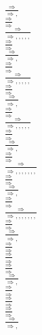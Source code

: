 \documentclass[11pt]{article}
\begin{document}
\begin{center}
\bigskip
\\$\frac{\Rightarrow }{\Rightarrow , }$
\bigskip
\\$\frac{\Rightarrow }{\Rightarrow }$
\bigskip
\\$\frac{\Rightarrow }{\Rightarrow , , , , , }$
\bigskip
\\$\frac{\Rightarrow }{\Rightarrow }$
\bigskip
\\$\frac{\Rightarrow }{\Rightarrow , }$
\bigskip
\\$\frac{\Rightarrow }{\Rightarrow }$
\bigskip
\\$\frac{\Rightarrow }{\Rightarrow , , , , , }$
\bigskip
\\$\frac{\Rightarrow }{\Rightarrow }$
\bigskip
\\$\frac{\Rightarrow }{\Rightarrow , }$
\bigskip
\\$\frac{\Rightarrow }{\Rightarrow }$
\bigskip
\\$\frac{\Rightarrow }{\Rightarrow , , , , , }$
\bigskip
\\$\frac{\Rightarrow }{\Rightarrow }$
\bigskip
\\$\frac{\Rightarrow }{\Rightarrow , }$
\bigskip
\\$\frac{\Rightarrow }{\Rightarrow }$
\bigskip
\\$\frac{\Rightarrow }{\Rightarrow , , , , , , , }$
\bigskip
\\$\frac{\Rightarrow }{\Rightarrow }$
\bigskip
\\$\frac{\Rightarrow }{\Rightarrow , }$
\bigskip
\\$\frac{\Rightarrow }{\Rightarrow }$
\bigskip
\\$\frac{\Rightarrow }{\Rightarrow , , , , , , , }$
\bigskip
\\$\frac{\Rightarrow }{\Rightarrow }$
\bigskip
\\$\frac{\Rightarrow }{\Rightarrow , }$
\bigskip
\\$\frac{\Rightarrow }{\Rightarrow }$
\bigskip
\\$\frac{\Rightarrow }{\Rightarrow }$
\bigskip
\\$\frac{\Rightarrow }{\Rightarrow }$
\bigskip
\\$\frac{\Rightarrow }{\Rightarrow , }$
\bigskip
\\$\frac{\Rightarrow }{\Rightarrow }$
\bigskip
\\$\frac{\Rightarrow }{\Rightarrow }$
\bigskip
\\$\frac{\Rightarrow }{\Rightarrow }$
\bigskip
\\$\frac{\Rightarrow }{\Rightarrow , }$
\bigskip

\end{center}
\end{document}
